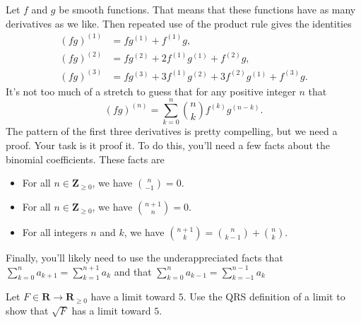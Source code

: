 \documentclass[12pt,fleqn,answers]{exam}
\newcommand{\reals}{\mathbf{R}}
\newcommand{\integers}{\mathbf{Z}}
\begin{document}
\begin{questions}
\question 
    \question [10] Let $f$ and $g$ be smooth functions.  That means that these 
    functions have as many derivatives as we like. Then repeated use of
    the product rule gives the identities
    \begin{align*}
       (f g)^{(1)} &= f g^{(1)} + f^{(1)} g, \\
       (f g)^{(2)} &= f g^{(2)} + 2 f^{(1)} g^{(1)} + f^{(2)} g, \\
       (f g)^{(3)} &= f g^{(3)} + 3 f^{(1)} g^{(2)} +  3 f^{(2)} g^{(1)} + f^{(3)} g.        
    \end{align*}
    It's not too much of a stretch to guess that for any positive integer $n$ that
    \begin{equation*}
        (f g)^{(n)} = \sum_{k=0}^n \binom{n}{k} f^{(k)} g^{(n-k)}.
    \end{equation*}
    The pattern of the first three derivatives is pretty compelling, but we 
    need a proof. Your task is it proof it. To do this, you'll need a few
    facts about the binomial coefficients. These facts are 
    \begin{itemize}
        \item For all $n \in \integers_{\geq 0}$, we have 
              $ \binom{n}{-1} = 0 $.

        \item For all $n \in \integers_{\geq 0}$, we have
                $\binom{n+1}{n} = 0$.

        \item For all integers $n$ and $k$, we have 
        $\binom{n+1}{k} = \binom{n}{k-1} + \binom{n}{k}$.

    \end{itemize}
 Finally, you'll likely need to use the underappreciated
 facts that $\displaystyle \sum_{k=0}^n  a_{k+1} =  \sum_{k=1}^{n+1}  a_k$
 and that $\displaystyle \sum_{k=0}^n  a_{k-1} =  \sum_{k=-1}^{n-1}  a_k$


 \item Let $F \in \reals \to \reals_{\geq 0}$ have a limit
 toward $5$. Use the QRS definition of a limit to 
 show that $\sqrt{F}$ has a limit toward $5$.
\end{questions}
\end{document}
